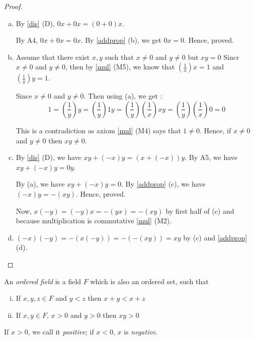 \begin{proof}
    \begin{enumerate}[a)]
        \item By \ref{dis} (D), $0x + 0x = (0 + 0)x$.
        
        By A4, $0x + 0x = 0x$. By \ref{addprop} (b), we get $0x = 0$. Hence, proved.

        \item Assume that there exist $x, y$ such that $x \neq 0$ and $y \neq 0$ but $xy = 0$
        Sincr $x \neq  0$ and $y \neq 0$, then by \ref{mul} (M5), 
        we know that $\left( \frac{1}{x} \right) x = 1$ 
        and $\left( \frac{1}{y} \right) y = 1$.

        Since $x \neq 0$ and $y \neq 0$. Then using (a), we get :
            $$ 1 = \left( \frac{1}{y} \right) y = \left( \frac{1}{y} \right) 1 y
                = \left( \frac{1}{y} \right) \left( \frac{1}{x} \right) x y 
                = \left( \frac{1}{y} \right) \left( \frac{1}{x} \right) 0 
                = 0
            $$

        This is a contradiction as axiom \ref{mul} (M4) says that $1 \neq 0$.
        Hence, if $x \neq 0$ and $y \neq 0$ then $xy \neq 0$.

        \item By \ref{dis} (D), we have $xy + (-x)y = (x+(-x))y$.
        By A5, we have $xy + (-x)y = 0y$.

        By (a), we have $xy + (-x)y = 0$.
        By \ref{addprop} (c), we have $(-x)y = -(xy)$. Hence, proved.

        Now, $x(-y) = (-y)x = -(yx) = -(xy)$ by first half of (c) 
        and because multiplication is commutative \ref{mul} (M2).

        \item $(-x)(-y) = -(x(-y)) = -(-(xy)) = xy$ by (c) and \ref{addprop} (d).
    \end{enumerate}
\end{proof}


\begin{defn}
    \label{ordf}
    An {\it ordered field} is a field $F$ which is also an ordered set, such that
    \begin{enumerate}[(i)]
        \item If $x, y, z \in F$ and $y < z$ then $x + y < x + z$
        \item If $x, y \in F$, $x > 0$ and $y > 0$ then $xy > 0$
    \end{enumerate}
    If $x > 0$, we call it {\it positive}; if $x < 0$, $x$ is {\it negative}.
\end{defn}

